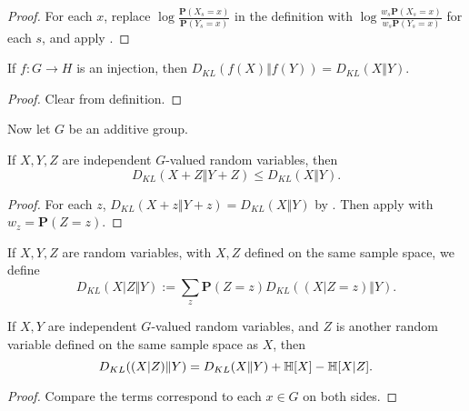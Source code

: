 \begin{proof}
For each $x$, replace $\log \frac{\mathbf{P}(X_s=x)}{\mathbf{P}(Y_s=x)}$ in the definition with $\log \frac{w_s\mathbf{P}(X_s=x)}{w_s\mathbf{P}(Y_s=x)}$ for each $s$, and apply .
\end{proof}


\begin{lemma}\label{kl-div-inj}\leanok  If $f:G \to H$ is an injection, then $D_{KL}(f(X)\Vert f(Y)) = D_{KL}(X\Vert Y)$.
\end{lemma}

\begin{proof} Clear from definition.
\end{proof}

Now let $G$ be an additive group.

\begin{lemma}\label{kl-sums}\leanok If $X, Y, Z$ are independent $G$-valued random variables, then
  $$D_{KL}(X+Z\Vert Y+Z) \leq D_{KL}(X\Vert Y).$$
\end{lemma}

\begin{proof}
For each $z$, $D_{KL}(X+z\Vert Y+z)=D_{KL}(X\Vert Y)$ by . Then apply  with $w_z=\mathbf{P}(Z=z)$.
\end{proof}

\begin{definition}\label{ckl-div}  \leanok
  If $X,Y,Z$ are random variables, with $X,Z$ defined on the same sample space, we define
$$ D_{KL}(X|Z \Vert  Y) := \sum_z \mathbf{P}(Z=z) D_{KL}( (X|Z=z) \Vert  Y).$$
\end{definition}

\begin{lemma}\label{kl-cond}\leanok If $X, Y$ are independent $G$-valued random variables, and $Z$ is another random variable defined on the same sample space as $X$, then
  $$D_{KL}((X|Z)\Vert Y) = D_{KL}(X\Vert Y) + \mathbb{H}[X] - \mathbb{H}[X|Z].$$
\end{lemma}

\begin{proof}
   Compare the terms correspond to each $x\in G$ on both sides.
\end{proof}

